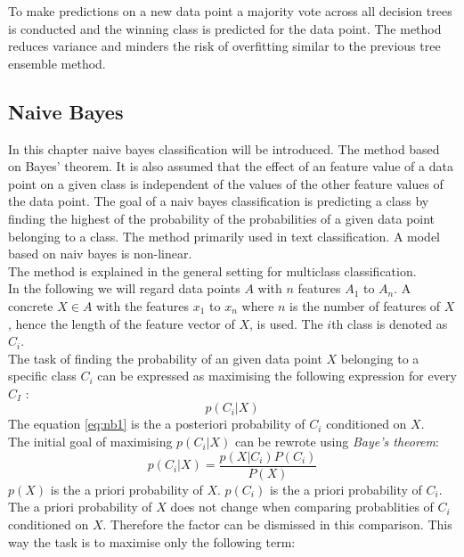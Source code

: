To make predictions on a new data point  a majority vote across all decision trees is conducted and the winning class is predicted for the data point. The method reduces variance and minders the risk of overfitting similar to the previous tree ensemble method.
\subsection{Naive Bayes}
In this chapter naive bayes classification will be introduced. The method based on Bayes’ theorem. It is also assumed that the effect of an feature value of a data point on a given class is independent of the values of the other feature values of the data point. The goal of a naiv bayes classification is predicting a class by finding the highest of the probability of the probabilities of a given data point belonging to a class. The method primarily used in text classification.
A model based on naiv bayes is non-linear.
\\
The method is explained in the general setting for multiclass classification.
\\
In the following we will regard data points $A$ with $n$ features $A_1$ to $A_n$. A concrete $X \in A$ with the features $x_1$ to $x_n$ where $n$ is the number of features of $X$, hence the length of the feature vector of $X$, is used. The $i$th class is denoted as $C_i$.\\
The task of finding the probability of an given data point $X$ belonging to a specific class $C_i$ can be expressed as maximising the following expression for every $C_I$ :
\begin{equation} \label{eq:nb1}
 p(C_i|X)
\end{equation}
The equation \ref{eq:nb1} is the a posteriori probability of $C_i$ conditioned on $X$.
\\
The initial goal of maximising $p(C_i|X)$ can be rewrote using \emph{Baye's theorem}:
\begin{equation} \label{eq:nb2}
p(C_i|X)=\frac{p(X|C_i) P(C_i)}{P(X)}
\end{equation}
$p(X)$ is the a priori probability of $X$. $p(C_i)$ is the a priori probability of $C_i$.
\\
The a priori probability of $X$ does not change when comparing probablities of $C_i$ conditioned on $X$. Therefore the factor can be dismissed in this comparison. This way the task is to maximise only the following term:
